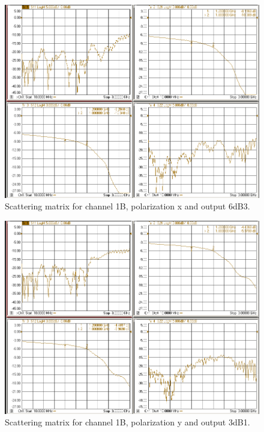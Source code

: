 \documentclass[12pt,a4paper,oneside]{article}
\begin{document}
\begin{figure}[H]
\centering
\includegraphics[width=0.9\linewidth]{VNA_results/1Bx_6dB3.png}
\caption{Scattering matrix for channel 1B, polarization x and output 6dB3.}
\label{fig:1Bx_6dB3}
\end{figure}


\begin{figure}[H]
\centering
\includegraphics[width=0.9\linewidth]{VNA_results/1By_3dB1.png}
\caption{Scattering matrix for channel 1B, polarization y and output 3dB1.}
\label{fig:1By_3dB1}
\end{figure}
\end{document}
